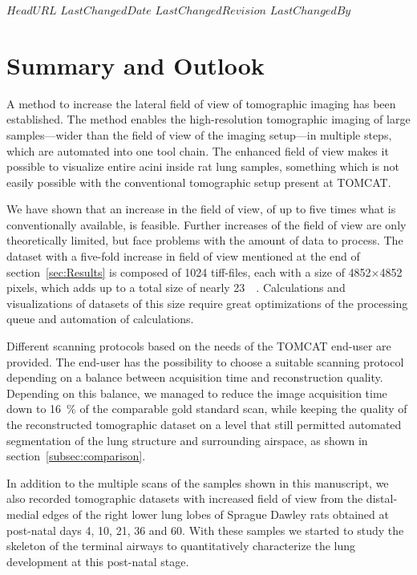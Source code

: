 \svnidlong
{$HeadURL$}
{$LastChangedDate$}
{$LastChangedRevision$}
{$LastChangedBy$}
%
%
\section{Summary and Outlook}\label{summary and outlook}%

A method to increase the lateral field of view of tomographic imaging has been established. The method enables the high-resolution tomographic imaging of large samples---wider than the field of view of the imaging setup---in multiple steps, which are automated into one tool chain. The enhanced field of view makes it possible to visualize entire acini inside rat lung samples, something which is not easily possible with the conventional tomographic setup present at TOMCAT.

We have shown that an increase in the field of view, of up to five times what is conventionally available, is feasible. Further increases of the field of view are only theoretically limited, but face problems with the amount of data to process. The dataset with a five-fold increase in field of view mentioned at the end of section~\ref{sec:Results} is composed of 1024 tiff-files, each with a size of 4852$\times$4852 pixels, which adds up to a total size of nearly \SI{23}{\giga\byte}. Calculations and visualizations of datasets of this size require great optimizations of the processing queue and automation of calculations.

Different scanning protocols based on the needs of the TOMCAT end-user are provided. The end-user has the possibility to choose a suitable scanning protocol depending on a balance between acquisition time and reconstruction quality. Depending on this balance, we managed to reduce the image acquisition time down to \SI{16}{\percent} of the comparable gold standard scan, while keeping the quality of the reconstructed tomographic dataset on a level that still permitted automated segmentation of the lung structure and surrounding airspace, as shown in section~\ref{subsec:comparison}.

In addition to the multiple scans of the samples shown in this manuscript, we also recorded tomographic datasets with increased field of view from the distal-medial edges of the right lower lung lobes of Sprague Dawley rats obtained at post-natal days 4, 10, 21, 36 and 60. With these samples we started to study the skeleton of the terminal airways to quantitatively characterize the lung development at this post-natal stage.